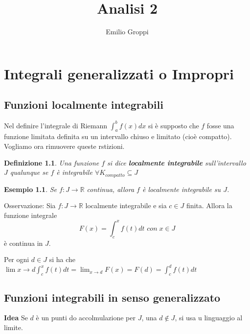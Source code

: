 \documentclass[a4paper; 11pt oneside]{book}
\title{Analisi 2}
\author{Emilio Groppi}
\theoremstyle{break}
\newtheorem{defin}[teo]{Definizione}
\theoremstyle{peresempio}
\newtheorem{es}[cor]{Esempio}
\begin{document}
\maketitle
\tableofcontents
\chapter{Integrali generalizzati o Impropri}
\section{Funzioni localmente integrabili}

Nel definire l'integrale di Riemann $\int_a^b f(x)dx$ si è supposto che $f$ fosse una funzione limitata definita su un intervallo chiuso e limitato (cioè compatto). Vogliamo ora rimuovere queste rstizioni.
\begin{defin}
Una funzione $f$ si dice \textbf{localmente integrabile} sull'intervallo $J$ qualunque se $f$ è integrabile $\forall K_{compatto}\subseteq J$
\end{defin}

\begin{es}
Se $f:J\to\mathbb{R}$ continua, allora $f$ è localmente integrabile su $J$.
\end{es}
Osservazione:
Sia $f:J\to\mathbb{R}$ localmente integrabile e sia $c\in J$ finita. Allora la funzione integrale
$$F(x)=\int_c^x f(t)dt \,\, con \;x\in J $$
è continua in $J$.

Per ogni $d\in J$ si ha che $\lim{x\to d}\int_c^x f(t)dt=\lim_{x\to d} F(x)=F(d)=\int_c^d f(t)dt$
\section{Funzioni integrabili in senso generalizzato}
\textbf{Idea}\newline
Se $d$ è un punti do accolmulazione per $J$, una $d\notin J$, si usa u linguaggio al limite.
\end{document}
